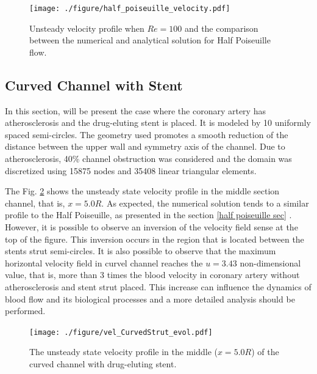 \documentclass[10pt,fleqn,a4paper,twoside]{article}
\begin{document}
\begin{figure}[H]
     \centering
     \texttt{[image: ./figure/half\_poiseuille\_velocity.pdf]}\\
     \medskip
     \label{velocidade half poiseuille}
     \caption{
Unsteady velocity profile when $Re=100$ and the comparison between
the numerical and analytical solution for Half Poiseuille flow.} 
\end{figure}





\subsection{Curved Channel with Stent} \label{canal curvado com stent}

In this section, will be present
the case where the coronary 
artery has atherosclerosis and 
the drug-eluting stent is placed. 
It is modeled by 10 uniformly spaced 
semi-circles. 
The geometry used promotes a smooth reduction of the 
distance between the upper wall and symmetry axis of the channel. 
Due to atherosclerosis, 40\% channel obstruction was considered 
and the domain was discretized using 15875 nodes and 35408 
linear triangular elements. 

\vspace{0.2cm}
\par
The Fig. \ref{velocity evolution curved stent}  shows the unsteady state 
velocity profile in the middle section channel, that is, 
$x=5.0R$. 
As expected, the numerical solution tends to a similar profile to
the Half Poiseuille, as presented in the section \ref{half poiseuille sec} . However, it is possible to observe an inversion of the velocity
field sense at the top of the figure.
This inversion occurs in the region that is
located between the stents strut semi-circles.
It is also possible to observe that the maximum horizontal velocity field 
in curvel channel reaches the $u=3.43$ non-dimensional value, that is, 
more than 3 times the blood velocity in coronary artery
without atherosclerosis and stent strut placed. 
This increase can influence the dynamics of blood flow
and its biological processes and a more detailed analysis
should be performed.

\vspace{1cm}
\begin{figure}[H]
     \centering
     \texttt{[image: ./figure/vel\_CurvedStrut\_evol.pdf]}\\
     \label{velocity evolution curved stent}
     \caption{
The unsteady state velocity profile in the middle ($x=5.0R$) of the curved channel with drug-eluting stent.}
\end{figure}
\end{document}

